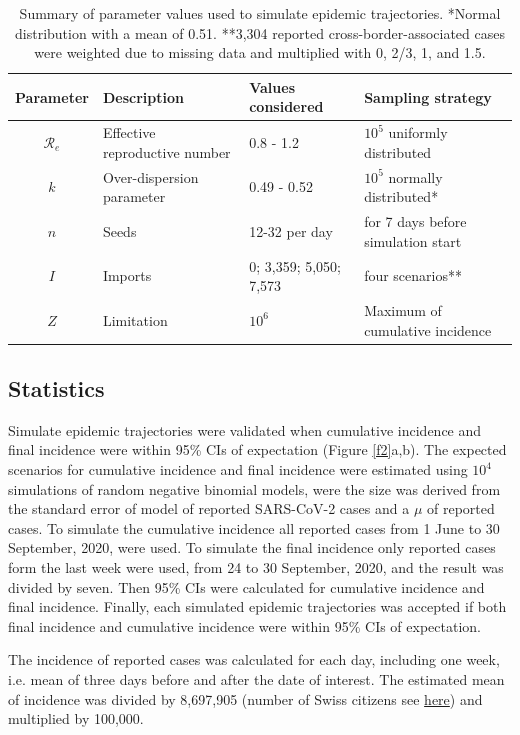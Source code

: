 \documentclass[10pt, a4paper, twoside]{article}
\begin{document}
\begin{multicols}{2}
\begin{table}
	\centering
\begin{small} \caption{Summary of parameter values used to simulate epidemic trajectories. *Normal distribution with a mean of 0.51. **3,304 reported cross-border-associated cases were weighted due to missing data and multiplied with 0, 2/3, 1, and 1.5.\\}\end{small} 
\label{t1}
\begin{tabular}{clll}
	\hline
	Parameter & Description & Values considered & Sampling strategy\\
	\hline
	$\mathcal{R}_e$ & Effective reproductive number & 0.8 - 1.2 & $10^5$ uniformly distributed\\
	$k$ & Over-dispersion parameter & 0.49 - 0.52 & $10^5$ normally distributed*\\
	$n$ & Seeds & 12-32 per day & for 7 days before simulation start\\
	$I$ & Imports & 0; 3,359; 5,050; 7,573 & four scenarios**\\
	$Z$ & Limitation & $10^6$ & Maximum of cumulative incidence\\
	\hline
\end{tabular}
\end{table}

\subsection{Statistics}
Simulate epidemic trajectories were validated when cumulative incidence and final incidence were within 95\% CIs of expectation (Figure \ref{f2}a,b).
The expected scenarios for cumulative incidence and final incidence were estimated using $10^4$ simulations of random negative binomial models, were the size was derived from the standard error of model of reported SARS-CoV-2 cases and a $\mu$ of reported cases.
To simulate the cumulative incidence all reported cases from 1 June to 30 September, 2020, were used.
To simulate the final incidence only reported cases form the last week were used, from 24 to 30 September, 2020, and the result was divided by seven.
Then 95\% CIs were calculated for cumulative incidence and final incidence. 
Finally, each simulated epidemic trajectories was accepted if both final incidence and cumulative incidence were within 95\% CIs of expectation.

The incidence of reported cases was calculated for each day, including one week, i.e. mean of three days before and after the date of interest.
The estimated mean of incidence was divided by 8,697,905 (number of Swiss citizens see \href{https://www.worldometers.info/world-population/switzerland-population/}{here}) and multiplied by 100,000.


\end{multicols}
\end{document}
